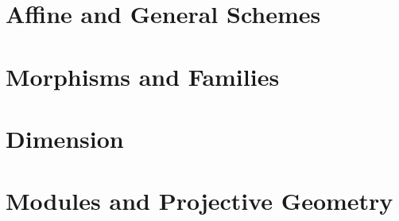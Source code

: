 \documentclass[11pt,a4paper,oneside,openany]{book}
\begin{document}
\part{Affine and General Schemes}






\part{Morphisms and Families}







\part{Dimension}





\part{Modules and Projective Geometry}







\end{document}
